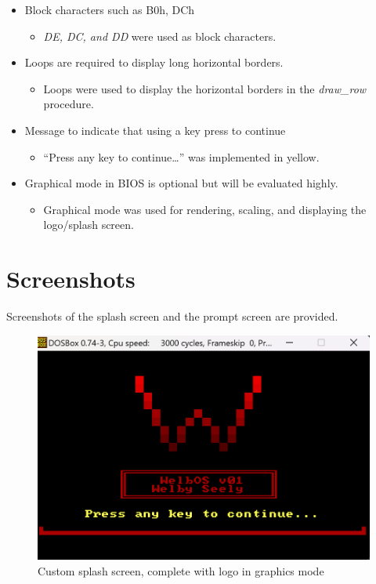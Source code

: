 \documentclass{article}
\begin{document}
\begin{itemize}
\begin{itemize}
            \end{itemize}
        \item Block characters such as B0h, DCh
            \begin{itemize}
                \item \textit{DE, DC, and DD} were used as block characters.
            \end{itemize}
        \item Loops are required to display long horizontal borders.
            \begin{itemize}
                \item Loops were used to display the horizontal borders in the \textit{draw\_row} procedure.
            \end{itemize}
        \item Message to indicate that using a key press to continue
            \begin{itemize}
                \item ``Press any key to continue\ldots'' was implemented in yellow.
            \end{itemize}
        \item Graphical mode in BIOS is optional but will be evaluated highly.
        \begin{itemize}
            \item Graphical mode was used for rendering, scaling, and displaying the logo/splash screen.
        \end{itemize}
    \end{itemize}

    \section{Screenshots}\label{sec:screenshots}
    Screenshots of the splash screen and the prompt screen are provided.

    \begin{figure}[H]  %
        \centering
        \includegraphics[width=\textwidth]{splash-screen} %
        \caption{Custom splash screen, complete with logo in graphics mode}
        \label{fig:1}
    \end{figure}
\end{document}
